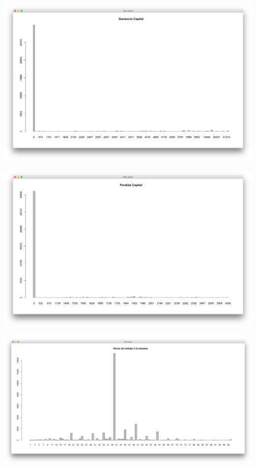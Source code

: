 \documentclass{article}
\begin{document}
 \begin{center}
   \hbox{\hspace{-5.8em}\includegraphics[scale=0.4]{graficas/gananciaCapital}}
 \end{center}
 \begin{center}
   \hbox{\hspace{-5.8em}\includegraphics[scale=0.4]{graficas/perdidaCapital}}
 \end{center}
 \begin{center}
   \hbox{\hspace{-5.8em}\includegraphics[scale=0.33]{graficas/horasALaSemana}}
 \end{center}
\end{document}
